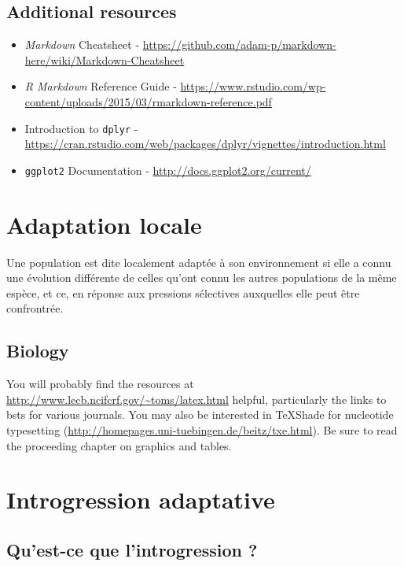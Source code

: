 \documentclass[12pt,twoside]{reedthesis}
\theoremstyle{definition}
\theoremstyle{definition}
\theoremstyle{remark}
\begin{document}
  \section{Additional resources}\label{additional-resources}
  
  \begin{itemize}
  \item
    \emph{Markdown} Cheatsheet -
    \url{https://github.com/adam-p/markdown-here/wiki/Markdown-Cheatsheet}
  \item
    \emph{R Markdown} Reference Guide -
    \url{https://www.rstudio.com/wp-content/uploads/2015/03/rmarkdown-reference.pdf}
  \item
    Introduction to \texttt{dplyr} -
    \url{https://cran.rstudio.com/web/packages/dplyr/vignettes/introduction.html}
  \item
    \texttt{ggplot2} Documentation -
    \url{http://docs.ggplot2.org/current/}
  \end{itemize}
  
  \chapter{Adaptation locale}\label{adaptation-locale}
  
  Une population est dite localement adaptée à son environnement si elle a
  connu une évolution différente de celles qu'ont connu les autres
  populations de la même espèce, et ce, en réponse aux pressions
  sélectives auxquelles elle peut être confrontrée.
  
  \section{Biology}\label{biology}
  
  You will probably find the resources at
  \url{http://www.lecb.ncifcrf.gov/~toms/latex.html} helpful, particularly
  the links to bsts for various journals. You may also be interested in
  TeXShade for nucleotide typesetting
  (\url{http://homepages.uni-tuebingen.de/beitz/txe.html}). Be sure to
  read the proceeding chapter on graphics and tables.
  
  \chapter{Introgression adaptative}\label{introgression-adaptative}
  
  \section{Qu'est-ce que l'introgression
  ?}\label{quest-ce-que-lintrogression}
  
\end{document}
